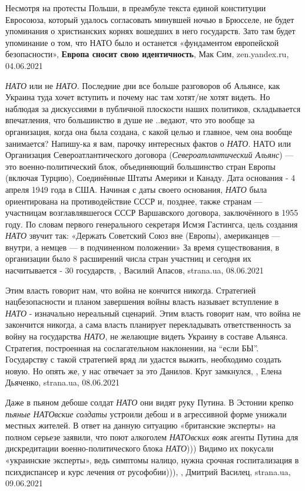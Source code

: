 Несмотря на протесты Польши, в преамбуле текста единой конституции Евросоюза,
который удалось согласовать минувшей ночью в Брюсселе, не будет упоминания о
христианских корнях вошедших в него государств. Зато там будет упоминание о
том, что НАТО было и останется «фундаментом европейской безопасности»,
\textbf{Европа сносит свою идентичность}, Мак Сим, zen.yandex.ru, 04.06.2021

\emph{НАТО} или не \emph{НАТО}.  Последние дни все больше разговоров об
Альянсе, как Украина туда хочет вступить и почему нас там хотят/не хотят
видеть.  Но наблюдая за дискуссиями в публичной плоскости наших политиков,
складывается впечатления, что большинство в душе не ..ведают, что это вообще за
организация, когда она была создана, с какой целью и главное, чем она вообще
занимается?  Напишу-ка я вам, парочку интересных фактов о \emph{НАТО}.  НАТО
или Организация Североатлантического договора (\emph{Североатлантический
Альянс}) — это военно-политический блок, объединяющий большинство стран Европы
(включая Турцию), Соединённые Штаты Америки и Канаду.  Дата основания - 4
апреля 1949 года в США.  Начиная с даты своего основания, \emph{НАТО} была
ориентирована на противодействие СССР и, позднее, также странам — участницам
возглавлявшегося СССР Варшавского договора, заключённого в 1955 году.  По
словам первого генерального секретаря Исмэя Гастингса, цель создания
\emph{НАТО} звучит так: «Держать Советский Союз вне (Европы), американцев —
внутри, а немцев — в подчиненном положении» За время существования, в
организации было 8 расширений числа стран участниц и сегодня их насчитывается -
30 государств,
, Василий Апасов, strana.ua, 08.06.2021

Этим власть говорит нам, что война не кончится никогда.  Стратегией
нацбезопасности и планом завершения войны власть называет вступление в
\emph{НАТО} - изначально нереальный сценарий. Этим власть говорит нам, что
война не закончится никогда, а сама власть планирует перекладывать
ответственность за войну на государства \emph{НАТО}, не желающие видеть Украину
в составе Альянса.  Стратегия, построенная на сослагательном наклонении, на
\enquote{если БЫ}.  Государству с такой стратегией вряд ли удастся выжить,
необходимо создать новую. Но опять же, у нас отвечает за это Данилов. Круг
замкнулся,
, Елена Дьяченко, strana.ua, 08.06.2021

Даже в пьяном дебоше солдат \emph{НАТО} они видят руку Путина.  В Эстонии
крепко \emph{пьяные НАТОвские солдаты} устроили дебош и в агрессивной форме
унижали местных жителей.  В ответ на данную ситуацию «британские эксперты» на
полном серьезе заявили, что поют алкоголем \emph{НАТОвских вояк} агенты Путина
для дискредитации военно-политического блока \emph{НАТО}))) Видимо их покусали
«украинские эксперты», ведь симптомы налицо, нужна срочная госпитализация в
психдиспансер и курс лечения от русофобии))),
, Дмитрий Василец, strana.ua, 09.06.2021

